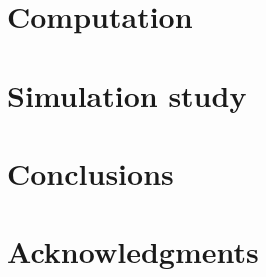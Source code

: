 \documentclass[11pt]{article}
\begin{document}
\section{Computation}\label{s:comp}



\section{Simulation study}\label{s:sim}

\section{Conclusions}\label{s:con}

\section*{Acknowledgments}




\end{document}
